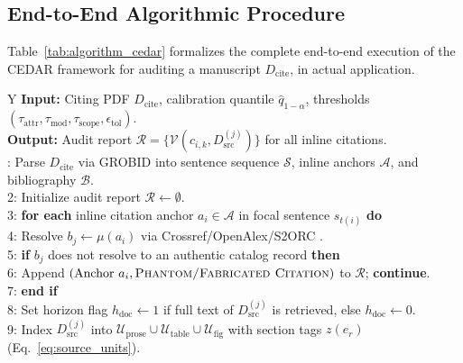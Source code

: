 \documentclass[sigconf]{acmart}
\begin{document}
\subsection{End-to-End Algorithmic Procedure}
Table~\ref{tab:algorithm_cedar} formalizes the complete end-to-end execution of the CEDAR framework for auditing a manuscript $D_{\text{cite}}$, in actual application.

\begin{table}[t]
\centering
\footnotesize
\caption{Algorithm 1: End-to-End CEDAR Citation Verification Procedure}
\label{tab:algorithm_cedar}
\renewcommand{\arraystretch}{1.12}
\begin{tabularx}{\columnwidth}{Y}
\toprule
\textbf{Input:} Citing PDF $D_{\text{cite}}$, calibration quantile $\hat{q}_{1-\alpha}$, thresholds $(\tau_{\text{attr}}, \tau_{\text{mod}}, \tau_{\text{scope}}, \epsilon_{\text{tol}})$. \\
\textbf{Output:} Audit report $\mathcal{R} = \{\mathcal{V}(c_{i,k}, D_{\text{src}}^{(j)})\}$ for all inline citations. \\
: Parse $D_{\text{cite}}$ via GROBID \cite{lopez2009grobid} into sentence sequence $\mathcal{S}$, inline anchors $\mathcal{A}$, and bibliography $\mathcal{B}$. \\
2: Initialize audit report $\mathcal{R} \leftarrow \emptyset$. \\
3: \textbf{for each} inline citation anchor $a_i \in \mathcal{A}$ in focal sentence $s_{t(i)}$ \textbf{do} \\
4: \hspace{0.8em} Resolve $b_j \leftarrow \mu(a_i)$ via Crossref/OpenAlex/S2ORC \cite{lo2020s2orc}. \\
5: \hspace{0.8em} \textbf{if} $b_j$ does not resolve to an authentic catalog record \textbf{then} \\
6: \hspace{1.6em} Append $(\text{Anchor } a_i, \textsc{Phantom/Fabricated Citation})$ to $\mathcal{R}$; \textbf{continue}. \\
7: \hspace{0.8em} \textbf{end if} \\
8: \hspace{0.8em} Set horizon flag $h_{\text{doc}} \leftarrow 1$ if full text of $D_{\text{src}}^{(j)}$ is retrieved, else $h_{\text{doc}} \leftarrow 0$. \\
9: \hspace{0.8em} Index $D_{\text{src}}^{(j)}$ into $\mathcal{U}_{\text{prose}} \cup \mathcal{U}_{\text{table}} \cup \mathcal{U}_{\text{fig}}$ with section tags $z(e_r)$ (Eq.~\ref{eq:source_units}). \\

\end{tabularx}
\end{table}
\end{document}
